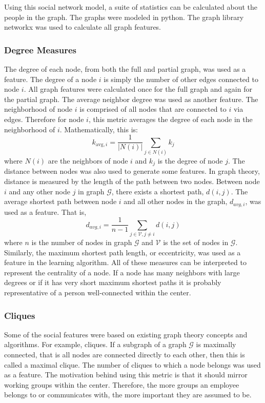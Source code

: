\documentclass[12pt]{report}
\begin{document}
Using this social network model, a suite of statistics can be calculated about the people in the graph.  The graphs were modeled in python.  The graph library networkx \cite{hagberg-2008-exploring} was used to calculate all graph features.

\subsubsection{Degree Measures}
The degree of each node, from both the full and partial graph, was used as a feature.  
The degree of a node $i$ is simply the number of other edges connected to node $i$.
All graph features were calculated once for the full graph and again for the partial graph.
The average neighbor degree was used as another feature.
The neighborhood of node $i$ is comprised of all nodes that are connected to $i$ via edges.
Therefore for node $i$, this metric averages the degree of each node in the neighborhood of $i$.
Mathematically, this is:
\begin{equation}
k_{\text{avg},i} = \frac{1}{|N(i)|}\sum_{j \in N(i)}k_j
\end{equation}
where $N(i)$ are the neighbors of node $i$ and $k_j$ is the degree of node $j$.
The distance between nodes was also used to generate some features.
In graph theory, distance is measured by the length of the path between two nodes.
Between node $i$ and any other node $j$ in graph $\mathcal{G}$, there exists a shortest path, $d(i,j)$.
The average shortest path between node $i$ and all other nodes in the graph, $d_{avg,i}$, was used as a feature.
That is,
\begin{equation}
d_{avg,i} = \frac{1}{n-1}\sum_{j \in \mathcal{V}, j\neq i}d(i,j)
\end{equation}
where $n$ is the number of nodes in graph $\mathcal{G}$ and $\mathcal{V}$ is the set of nodes in $\mathcal{G}$.
Similarly, the maximum shortest path length, or eccentricity, was used as a feature in the learning algorithm.
All of these measures can be interpreted to represent the centrality of a node.
If a node has many neighbors with large degrees or if it has very short maximum shortest paths it is probably representative of a person well-connected within the center.

\subsubsection{Cliques}
Some of the social features were based on existing graph theory concepts and algorithms.
For example, cliques.
If a subgraph of a graph $\mathcal{G}$ is maximally connected, that is all nodes are connected directly to each other, then this is called a maximal clique.
The number of cliques to which a node belongs was used as a feature.
The motivation behind using this metric is that it should mirror working groups within the center.
Therefore, the more groups an employee belongs to or communicates with, the more important they are assumed to be.
\end{document}
